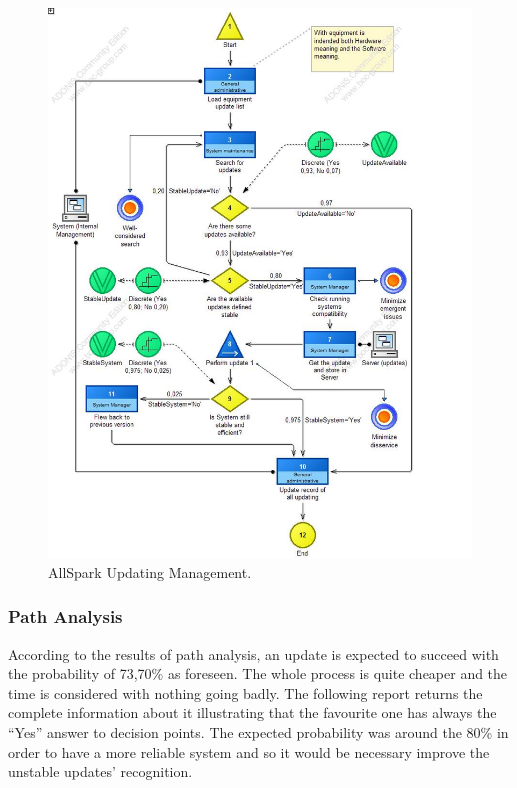 \begin{figure}[ht!]
\begin{centering}
\includegraphics[scale=0.50]{assign2/adonis/imgs/updating.jpg}
\caption{AllSpark Updating Management.}
\label{2img:updating}
\end{centering}
\end{figure}


\subsubsection{Path Analysis}
According to the results of path analysis, an update is expected to succeed with the probability of 73,70\% as foreseen. The whole process is quite cheaper and the time is considered with nothing going badly. The following report returns the complete information about it illustrating that the favourite one has always the ``Yes'' answer to decision points. The expected probability was around the 80\% in order to have a more reliable system and so it would be necessary improve the unstable updates' recognition.


